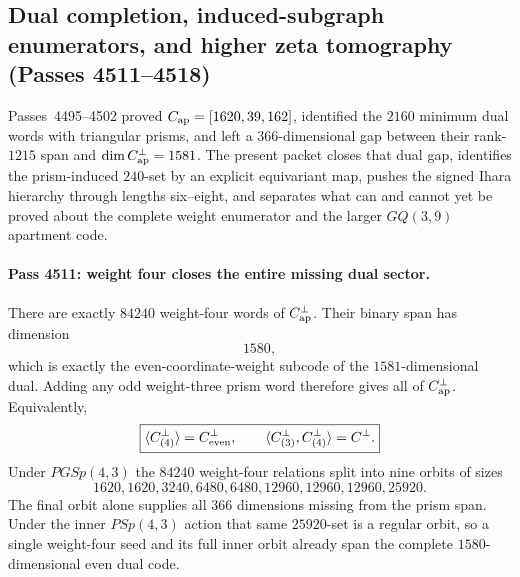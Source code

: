 \subsection{Dual completion, induced-subgraph enumerators, and higher zeta tomography (Passes 4511--4518)}
\label{sec:pass4511-4518-dual-enumerator-ihara-q53}

Passes~4495--4502 proved $C_{\rm ap}=[1620,39,162]$, identified the $2160$
minimum dual words with triangular prisms, and left a $366$-dimensional gap
between their rank-$1215$ span and $\dim C_{\rm ap}^{\perp}=1581$.  The present
packet closes that dual gap, identifies the prism-induced $240$-set by an
explicit equivariant map, pushes the signed Ihara hierarchy through lengths
six--eight, and separates what can and cannot yet be proved about the complete
weight enumerator and the larger $GQ(3,9)$ apartment code.

\paragraph{Pass 4511: weight four closes the entire missing dual sector.}
There are exactly $84240$ weight-four words of $C_{\rm ap}^{\perp}$.  Their
binary span has dimension
\[
 \boxed{1580},
\]
which is exactly the even-coordinate-weight subcode of the $1581$-dimensional
dual.  Adding any odd weight-three prism word therefore gives all of
$C_{\rm ap}^{\perp}$.  Equivalently,
\[
 \boxed{\langle C^\perp_{(4)}\rangle=C^\perp_{\rm even},\qquad
        \langle C^\perp_{(3)},C^\perp_{(4)}\rangle=C^\perp.}
\]
Under $PGSp(4,3)$ the $84240$ weight-four relations split into nine orbits of
sizes
\[
1620,1620,3240,6480,6480,12960,12960,12960,25920.
\]
The final orbit alone supplies all $366$ dimensions missing from the prism span.
Under the inner $PSp(4,3)$ action that same $25920$-set is a regular orbit, so a
single weight-four seed and its full inner orbit already span the complete
$1580$-dimensional even dual code.

